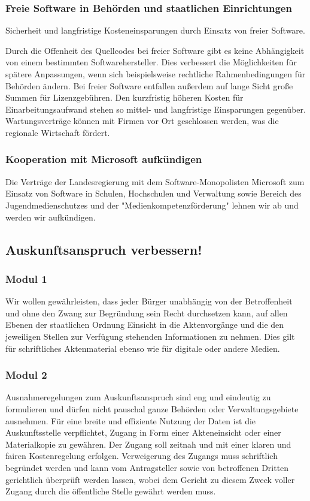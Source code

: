 \subsubsection{Freie Software in Behörden und staatlichen Einrichtungen}
\abstimmung
Sicherheit und langfristige Kosteneinsparungen durch Einsatz von freier Software.

Durch die Offenheit des Quellcodes bei freier Software gibt es keine Abhängigkeit von einem bestimmten Softwarehersteller. Dies verbessert die Möglichkeiten für spätere Anpassungen, wenn sich beispielsweise rechtliche Rahmenbedingungen für Behörden ändern. Bei freier Software entfallen außerdem auf lange Sicht große Summen für Lizenzgebühren. Den kurzfristig höheren Kosten für Einarbeitungsaufwand stehen so mittel- und langfristige Einsparungen gegenüber. Wartungsverträge können mit Firmen vor Ort geschlossen werden, was die regionale Wirtschaft fördert.
 
\subsubsection{Kooperation mit Microsoft aufkündigen}
Die Verträge der Landesregierung mit dem Software-Monopolisten Microsoft zum Einsatz von Software in Schulen, Hochschulen und Verwaltung sowie Bereich des Jugendmedienschutzes und der "Medienkompetenzförderung" lehnen wir ab und werden wir aufkündigen.
 
\subsection*{Auskunftsanspruch verbessern!}
\subsubsection{Modul 1}
\abstimmung
Wir wollen gewährleisten, dass jeder Bürger unabhängig von der Betroffenheit und ohne den Zwang zur Begründung sein Recht durchsetzen kann, auf allen Ebenen der staatlichen Ordnung Einsicht in die Aktenvorgänge und die den jeweiligen Stellen zur Verfügung stehenden Informationen zu nehmen. Dies gilt für schriftliches Aktenmaterial ebenso wie für digitale oder andere Medien.

\subsubsection{Modul 2}
\abstimmung
Ausnahmeregelungen zum Auskunftsanspruch sind eng und eindeutig zu formulieren und dürfen nicht pauschal ganze Behörden oder Verwaltungsgebiete ausnehmen. Für eine breite und effiziente Nutzung der Daten ist die Auskunftsstelle verpflichtet, Zugang in Form einer Akteneinsicht oder einer Materialkopie zu gewähren. Der Zugang soll zeitnah und mit einer klaren und fairen Kostenregelung erfolgen. Verweigerung des Zugangs muss schriftlich begründet werden und kann vom Antragsteller sowie von betroffenen Dritten gerichtlich überprüft werden lassen, wobei dem Gericht zu diesem Zweck voller Zugang durch die öffentliche Stelle gewährt werden muss.

